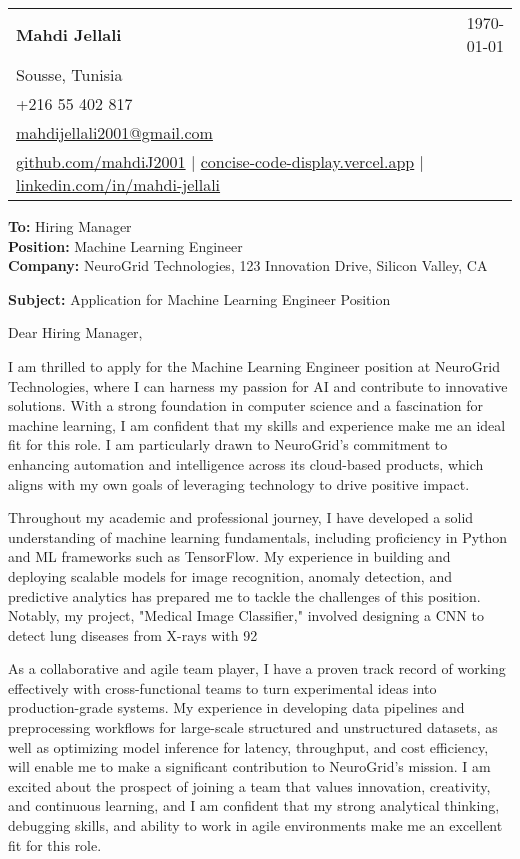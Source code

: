 \documentclass[letterpaper,11pt]{article}
\makeatletter
\newcommand{\letterHeading}[5]{
    \begin{tabular*}{\textwidth}{l@{\extracolsep{\fill}}r}
    \textbf{\Large #1} & #5 \\  %
    #2 & \\
    #3 & \\
    #4 & \\
    \end{tabular*}
    \vspace{15pt}
}
\newcommand{\letterRecipient}[3]{
    \textbf{\large To:} #1 \\
    \textbf{\large Position:} #2 \\
    \textbf{\large Company:} #3 \\
    \vspace{12pt}
}
\newcommand{\letterSubject}[1]{
    \textbf{\large Subject:} #1 \\
    \vspace{15pt}
}
\makeatother
\begin{document}
    \letterHeading
    {Mahdi Jellali}
    {Sousse, Tunisia}
    {+216 55 402 817 \\ \href{mailto:mahdijellali2001@gmail.com}{mahdijellali2001@gmail.com}}
    {\href{https://github.com/mahdiJ2001}{github.com/mahdiJ2001} $|$ \href{https://concise-code-display.vercel.app/}{concise-code-display.vercel.app} $|$ \href{https://www.linkedin.com/in/mahdi-jellali/}{linkedin.com/in/mahdi-jellali}}
    {\today}

    \letterRecipient
    {Hiring Manager}
    {Machine Learning Engineer}
    {NeuroGrid Technologies, 123 Innovation Drive, Silicon Valley, CA}

    \letterSubject{Application for Machine Learning Engineer Position}

    Dear Hiring Manager,

    I am thrilled to apply for the Machine Learning Engineer position at NeuroGrid Technologies, where I can harness my passion for AI and contribute to innovative solutions. With a strong foundation in computer science and a fascination for machine learning, I am confident that my skills and experience make me an ideal fit for this role. I am particularly drawn to NeuroGrid's commitment to enhancing automation and intelligence across its cloud-based products, which aligns with my own goals of leveraging technology to drive positive impact.

    Throughout my academic and professional journey, I have developed a solid understanding of machine learning fundamentals, including proficiency in Python and ML frameworks such as TensorFlow. My experience in building and deploying scalable models for image recognition, anomaly detection, and predictive analytics has prepared me to tackle the challenges of this position. Notably, my project, "Medical Image Classifier," involved designing a CNN to detect lung diseases from X-rays with 92%

    As a collaborative and agile team player, I have a proven track record of working effectively with cross-functional teams to turn experimental ideas into production-grade systems. My experience in developing data pipelines and preprocessing workflows for large-scale structured and unstructured datasets, as well as optimizing model inference for latency, throughput, and cost efficiency, will enable me to make a significant contribution to NeuroGrid's mission. I am excited about the prospect of joining a team that values innovation, creativity, and continuous learning, and I am confident that my strong analytical thinking, debugging skills, and ability to work in agile environments make me an excellent fit for this role.
\end{document}
